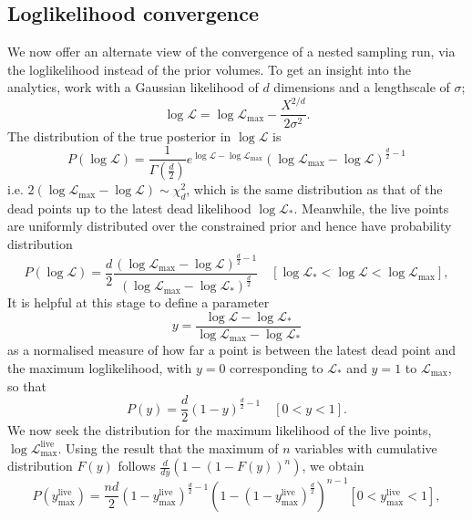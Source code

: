 \documentclass[usenatbib]{mnras}
\newcommand{\Like}{\mathcal{L}}
\begin{document}
\subsection{Loglikelihood convergence}
We now offer an alternate view of the convergence of a nested sampling run, via the loglikelihood instead of the prior volumes. To get an insight into the analytics, work with a Gaussian likelihood of $d$ dimensions and a lengthscale of $\sigma$;
\begin{equation}\label{eq:logL}
	\log\Like = \log\Like_\mathrm{max} - \frac{X^{2/d}}{2\sigma^2}.
\end{equation}
The distribution of the true posterior in $\log\Like$ is
\begin{equation}
    P(\log\mathcal{L}) = \frac{1}{\Gamma(\frac{d}{2})}e^{\log\mathcal{L}-\log\mathcal{L}_\mathrm{max}} (\log\mathcal{L}_\mathrm{max}-\log\mathcal{L})^{\frac{d}{2}-1}
\end{equation}
i.e. $2(\log\mathcal{L}_\mathrm{max}-\log\mathcal{L}) \sim \chi^2_{d}$, which is the same distribution as that of the dead points up to the latest dead likelihood $\log \Like_*$. Meanwhile, the live points are uniformly distributed over the constrained prior and hence have probability distribution
\begin{equation}
	P(\log\mathcal{L}) = \frac{d}{2}\frac{(\log\mathcal{L}_\mathrm{max}-\log\mathcal{L})^{\frac{d}{2}-1}}{(\log\mathcal{L}_\mathrm{max}-\log\mathcal{L}_*)^{\frac{d}{2}}} \quad [\log\Like_* < \log\Like <\log\Like_\mathrm{max}],
    \label{eq:PL}
\end{equation}
It is helpful at this stage to define a parameter
\begin{equation}
    y = \frac{\log\mathcal{L}-\log\mathcal{L}_*}{\log\mathcal{L}_\mathrm{max}-\log\mathcal{L}_*} 
    \label{eq:y}
\end{equation}
as a normalised measure of how far a point is between the latest dead point and the maximum loglikelihood, with $y=0$ corresponding to $\mathcal{L}_*$ and $y=1$ to $\mathcal{L}_\mathrm{max}$, so that
\begin{equation}
    P(y) = \frac{d}{2}(1-y)^{\frac{d}{2}-1} \quad [0<y<1].
    \label{eq:Py}
\end{equation}
We now seek the distribution for the maximum likelihood of the live points, $\log\Like_\mathrm{max}^{\mathrm{live}}$. Using the result that the maximum of $n$ variables with cumulative distribution $F(y)$ follows $\frac{d}{dy}( 1- (1-F(y))^n)$, we obtain
\begin{equation}
    P(y_\mathrm{max}^\mathrm{live}) = \frac{nd}{2}(1-y_\mathrm{max}^\mathrm{live})^{\frac{d}{2}-1}\left(1-(1-y_\mathrm{max}^\mathrm{live})^{\frac{d}{2}}\right)^{n-1}[0<y_\mathrm{max}^\mathrm{live}<1],
    \label{eq:Pyhat}
\end{equation}
\end{document}
